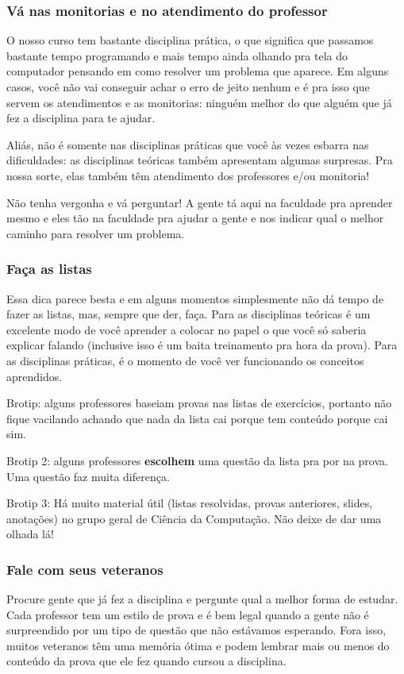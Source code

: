 \subsubsection{Vá nas monitorias e no atendimento do professor}
O nosso curso tem bastante disciplina prática, o que significa que passamos bastante tempo programando e mais tempo ainda olhando pra tela do computador pensando em como resolver um problema que aparece. Em alguns casos, você não vai conseguir achar o erro de jeito nenhum e é pra isso que servem os atendimentos e as monitorias: ninguém melhor do que alguém que já fez a disciplina para te ajudar. 

Aliás, não é somente nas disciplinas práticas que você às vezes esbarra nas dificuldades: as disciplinas teóricas também apresentam algumas surpresas. Pra nossa sorte, elas também têm atendimento dos professores e/ou monitoria! 

Não tenha vergonha e vá perguntar! A gente tá aqui na faculdade pra aprender mesmo e eles tão na faculdade pra ajudar a gente e nos indicar qual o melhor caminho para resolver um problema.

\subsubsection{Faça as listas}
Essa dica parece besta e em alguns momentos simplesmente não dá tempo de fazer as listas, mas, sempre que der, faça. Para as disciplinas teóricas é um excelente modo de você aprender a colocar no papel o que você só saberia explicar falando (inclusive isso é um baita treinamento pra hora da prova). Para as disciplinas práticas, é o momento de você ver funcionando os conceitos aprendidos.

Brotip: alguns professores baseiam provas nas listas de exercícios, portanto não fique vacilando achando que nada da lista cai porque tem conteúdo porque cai sim.

Brotip 2: alguns professores \textbf{escolhem} uma questão da lista pra por na prova. Uma questão faz muita diferença.

Brotip 3: Há muito material útil (listas resolvidas, provas anteriores, slides, anotações) no grupo geral de Ciência da Computação. Não deixe de dar uma olhada lá!

\subsubsection{Fale com seus veteranos}
Procure gente que já fez a disciplina e pergunte qual a melhor forma de estudar. Cada professor tem um estilo de prova e é bem legal quando a gente não é surpreendido por um tipo de questão que não estávamos esperando. Fora isso, muitos veteranos têm uma memória ótima e podem lembrar mais ou menos do conteúdo da prova que ele fez quando cursou a disciplina. 

